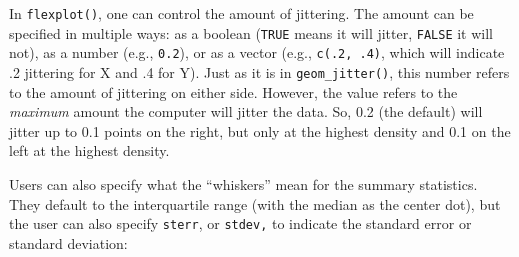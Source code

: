 \documentclass[
  man]{apa6}
\begin{document}
In \texttt{flexplot()}, one can control the amount of jittering. The amount can be specified in multiple ways: as a boolean (\texttt{TRUE} means it will jitter, \texttt{FALSE} it will not), as a number (e.g., \texttt{0.2}), or as a vector (e.g., \texttt{c(.2,\ .4)}, which will indicate .2 jittering for X and .4 for Y). Just as it is in \texttt{geom\_jitter()}, this number refers to the amount of jittering on either side. However, the value refers to the \emph{maximum} amount the computer will jitter the data. So, 0.2 (the default) will jitter up to 0.1 points on the right, but only at the highest density and 0.1 on the left at the highest density.

Users can also specify what the \enquote{whiskers} mean for the summary statistics. They default to the interquartile range (with the median as the center dot), but the user can also specify \texttt{sterr}, or \texttt{stdev,} to indicate the standard error or standard deviation:
\end{document}
